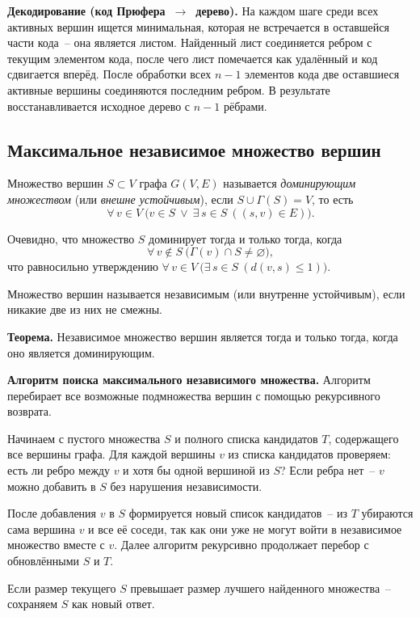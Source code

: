 \textbf{Декодирование (код Прюфера~$\to$~дерево).}
На каждом шаге среди всех активных вершин ищется минимальная,
которая не встречается в оставшейся части кода~-- она является листом.
Найденный лист соединяется ребром с текущим элементом кода,
после чего лист помечается как удалённый и код сдвигается вперёд.
После обработки всех $n-1$ элементов кода две оставшиеся активные
вершины соединяются последним ребром.
В результате восстанавливается исходное дерево с $n-1$ рёбрами.

\subsection{Максимальное независимое множество вершин}

Множество вершин $S \subset V$ графа $G(V, E)$ называется
\textit{доминирующим множеством} (или \textit{внешне устойчивым}),
если $S \cup \Gamma(S) = V$, то есть
\[
    \forall\, v \in V\ \bigl(v \in S\ \vee\ \exists\, s \in S\ ((s, v) \in E)\bigr).
\]

Очевидно, что множество $S$ доминирует тогда и только тогда, когда
\[
    \forall\, v \notin S\ \bigl(\Gamma(v) \cap S \neq \varnothing\bigr),
\]
что равносильно утверждению $\forall\, v \in V\ \bigl(\exists\, s \in S\ (d(v, s) \leqslant 1)\bigr)$.

Множество вершин называется независимым (или внутренне устойчивым), если
никакие две из них не смежны.

\textbf{Теорема.} Независимое множество вершин является
 тогда и только тогда, когда оно
является доминирующим.


\textbf{Алгоритм поиска максимального независимого множества.}
Алгоритм перебирает все возможные подмножества вершин с помощью
рекурсивного возврата.

Начинаем с пустого множества $S$ и полного списка кандидатов $T$,
содержащего все вершины графа.
Для каждой вершины $v$ из списка кандидатов проверяем:
есть ли ребро между $v$ и хотя бы одной вершиной из $S$?
Если ребра нет~-- $v$ можно добавить в $S$ без нарушения независимости.

После добавления $v$ в $S$ формируется новый список кандидатов~--
из $T$ убираются сама вершина $v$ и все её соседи,
так как они уже не могут войти в независимое множество вместе с $v$.
Далее алгоритм рекурсивно продолжает перебор с обновлёнными $S$ и $T$.

Если размер текущего $S$ превышает размер лучшего найденного
множества~-- сохраняем $S$ как новый ответ.

